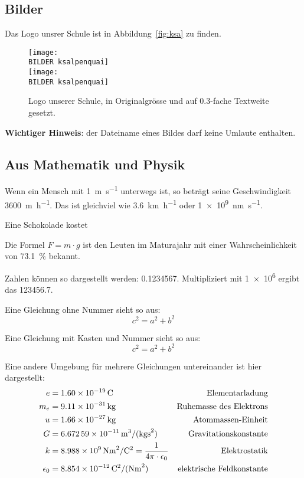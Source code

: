 \subsection*{Bilder}
Das Logo unsrer Schule ist in Abbildung~\vref{fig:ksa} zu finden.
\begin{figure}[htb]
	\centering
		\texttt{[image: \\BILDER ksalpenquai]} \\
		\vspace{1ex}
		\texttt{[image: \\BILDER ksalpenquai]}
 	\caption[Logo unserer Schule]{Logo unserer Schule, in Originalgrösse und auf 0.3-fache Textweite gesetzt.}
  \label{fig:ksa}
\end{figure}

\textbf{Wichtiger Hinweis}: der Dateiname eines Bildes darf keine Umlaute enthalten.

\subsection*{Aus Mathematik und Physik}

Wenn ein Mensch mit \SI{1}{\meter\per\second} unterwegs ist, so beträgt seine Geschwindigkeit \SI{3600}{\meter\per\hour}. 
Das ist gleichviel wie \SI{3.6}{\kilo\meter\per\hour} oder \SI{1e9}{\nano\meter\per\second}.

Eine Schokolade kostet 

Die Formel $F =  m \cdot  g$ ist den Leuten im Maturajahr mit einer Wahrscheinlichkeit von \SI{73.1}{\percent} bekannt. 

Zahlen können so dargestellt werden: \num{0.1234567}. Multipliziert mit \num{1e6} ergibt das \num{123456.7}.

Eine Gleichung ohne Nummer sieht so aus:
\begin{equation*}
c^2 =  a^2 + b^2
\end{equation*}

Eine Gleichung mit Kasten und Nummer sieht so aus:
\begin{equation}
\boxed{
	c^2 =  a^2 + b^2
}
\end{equation}

Eine andere Umgebung für mehrere Gleichungen untereinander ist hier dargestellt:
\begin{align*}
e &= \SI{1.60E-19}{\coulomb} &\text{Elementarladung} \\
m_{e} &=  \SI{9.11E-31}{\kilo\gram} &\text{Ruhemasse des Elektrons}\\
u &=  \SI{1.66e-27}{\kilo\gram} &\text{Atommassen-Einheit} \\
G&= \SI{6.67259E-11}{\meter^3\per(\kilo\gram\second^2)} &\text{Gravitationskonstante} \\
k& = \SI{8.988E9}{\newton\meter^2\per\coulomb^2}= \frac{1}{4 \pi \cdot \epsilon_0}  &\text{Elektrostatik} \\
\epsilon_0&= \SI{8.854E-12}{\coulomb^2\per(\newton\meter^2)} &\text{elektrische Feldkonstante}
\end{align*}

